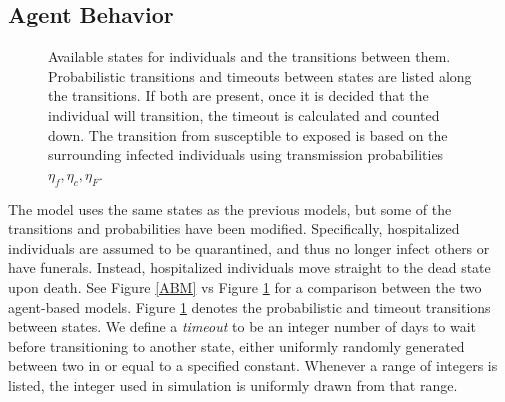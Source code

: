 \subsection{Agent Behavior}
\begin{figure}[h!t]
\begin{center}
\end{center}
\caption{Available states for individuals and the transitions between them. Probabilistic transitions and timeouts between states are listed along the transitions. If both are present, once it is decided that the individual will transition, the timeout is calculated and counted down. The transition from susceptible to exposed is based on the surrounding infected individuals using transmission probabilities $\eta_f,\eta_c,\eta_F$.}
\label{fig:sabm-states}
\end{figure}

The model uses the same states as the previous models, but some of the transitions and probabilities have been modified. Specifically, hospitalized individuals are assumed to be quarantined, and thus no longer infect others or have funerals. Instead, hospitalized individuals move straight to the dead state upon death. See Figure \ref{ABM} vs Figure \ref{fig:sabm-states} for a comparison between the two agent-based models. Figure \ref{fig:sabm-states} denotes the probabilistic and timeout transitions between states. We define a \emph{timeout} to be an integer number of days to wait before transitioning to another state, either uniformly randomly generated between two in or equal to a specified constant. Whenever a range of integers is listed, the integer used in simulation is uniformly drawn from that range.

